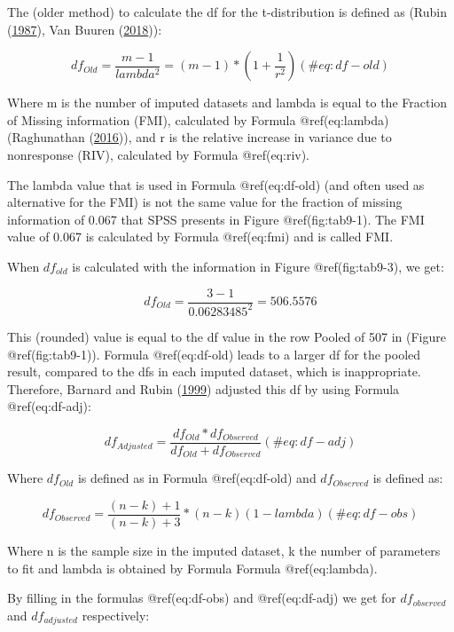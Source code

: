 \documentclass[
]{book}
\begin{document}
The (older method) to calculate the df for the t-distribution is defined
as (Rubin (\protect\hyperlink{ref-Rubin1987}{1987}), Van Buuren
(\protect\hyperlink{ref-VanBuuren2018}{2018})):

\begin{equation}
df_{Old} = \frac{m-1}{lambda^2} = (m-1) * (1 + \frac{1}{r^2})
  (\#eq:df-old)
\end{equation}

Where m is the number of imputed datasets and lambda is equal to the
Fraction of Missing information (FMI), calculated by Formula
@ref(eq:lambda) (Raghunathan
(\protect\hyperlink{ref-raghunathan2016}{2016})), and r is the relative
increase in variance due to nonresponse (RIV), calculated by Formula
@ref(eq:riv).

The lambda value that is used in Formula @ref(eq:df-old) (and often used
as alternative for the FMI) is not the same value for the fraction of
missing information of 0.067 that SPSS presents in Figure
@ref(fig:tab9-1). The FMI value of 0.067 is calculated by Formula
@ref(eq:fmi) and is called FMI.

When \(df_{old}\) is calculated with the information in Figure
@ref(fig:tab9-3), we get:

\[df_{Old} = \frac{3-1}{0.06283485^2} = 506.5576\]

This (rounded) value is equal to the df value in the row Pooled of 507
in (Figure @ref(fig:tab9-1)). Formula @ref(eq:df-old) leads to a larger
df for the pooled result, compared to the dfs in each imputed dataset,
which is inappropriate. Therefore, Barnard and Rubin
(\protect\hyperlink{ref-BARNARD1999}{1999}) adjusted this df by using
Formula @ref(eq:df-adj):

\begin{equation}
df_{Adjusted} = \frac{df_{Old}*{df_{Observed}}}{df_{Old}+{df_{Observed}}}
  (\#eq:df-adj)
\end{equation}

Where \(df_{Old}\) is defined as in Formula @ref(eq:df-old) and
\(df_{Observed}\) is defined as:

\begin{equation}
df_{Observed} = \frac{(n-k)+1}{(n-k)+3}*(n-k)(1-lambda)
  (\#eq:df-obs)
\end{equation}

Where n is the sample size in the imputed dataset, k the number of
parameters to fit and lambda is obtained by Formula Formula
@ref(eq:lambda).

By filling in the formulas @ref(eq:df-obs) and @ref(eq:df-adj) we get
for \(df_{observed}\) and \(df_{adjusted}\) respectively:
\end{document}
